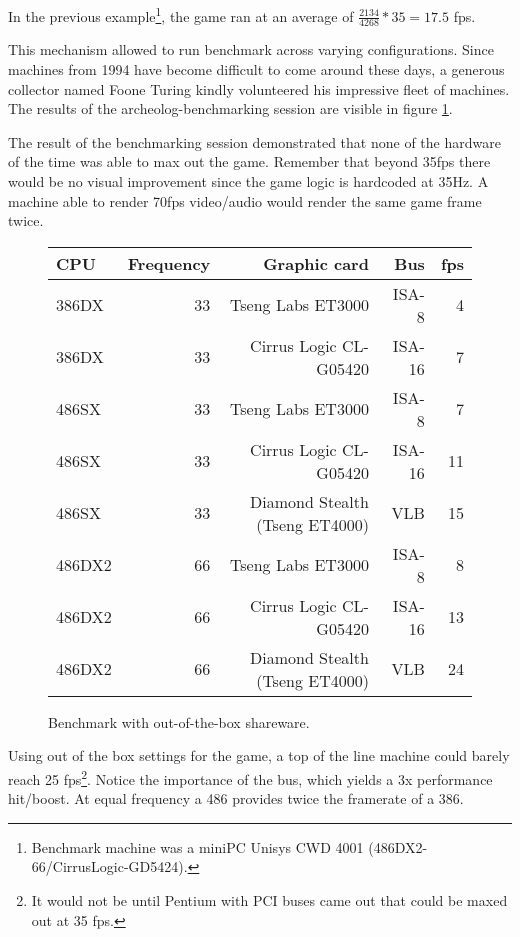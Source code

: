  \par
In the previous example\footnote{Benchmark machine was a miniPC Unisys CWD 4001 (486DX2-66/CirrusLogic-GD5424).}, the game ran at an average of $\frac{2134}{4268}*35 = 17.5$ fps. \\
\par
This mechanism allowed to run benchmark across varying configurations. Since machines from 1994 have become difficult to come around these days, a generous collector named Foone Turing kindly volunteered his impressive fleet of machines. The results of the archeolog-benchmarking session are visible in figure \ref{bnechmarsks}.\\
\par
 The result of the benchmarking session demonstrated that none of the hardware of the time was able to max out the game. Remember that beyond 35fps there would be no visual improvement since the game logic is hardcoded at 35Hz. A machine able to render 70fps video/audio would render the same game frame twice.\\
\par
\begin{figure}[H]
\centering  
\begin{tabularx}{\textwidth}{ L{1}  R{0.3} R{2.4} R{1} R{0.3} }
  \toprule
   \textbf{CPU} & \textbf{Frequency} & \textbf{Graphic card} & \textbf{Bus} & \textbf{fps}\\
  \toprule 
  386DX & 33 & Tseng Labs ET3000    & ISA-8  &  4\\
  386DX\protect\footnotemark & 33 & Cirrus Logic CL-G05420 & ISA-16 &  7\\
  \toprule 
  486SX & 33 & Tseng Labs ET3000                & ISA-8  &  7\\
  486SX & 33 & Cirrus Logic CL-G05420           & ISA-16 & 11\\ 
  486SX & 33 & Diamond Stealth (Tseng ET4000)   & VLB    & 15\\
  \toprule 
  486DX2 & 66 & Tseng Labs ET3000               & ISA-8  &  8\\
  486DX2 & 66 & Cirrus Logic CL-G05420          & ISA-16 & 13\\
  486DX2 & 66 & Diamond Stealth (Tseng ET4000)  & VLB    & 24\\
   \toprule
 \end{tabularx}
\caption{Benchmark with out-of-the-box \doom{} shareware.}
\label{bnechmarsks}
\end{figure}
\par
Using out of the box settings for the game, a top of the line machine could barely reach 25 fps\footnote{It would not be until Pentium with PCI buses came out that \doom{} could be maxed out at 35 fps.}. Notice the importance of the bus, which yields a 3x performance hit/boost. At equal frequency a 486 provides twice the framerate of a 386.\\
\par







